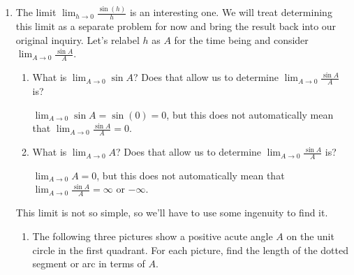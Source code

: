\documentclass[main]{subfiles}
\begin{document}
\begin{enumerate}
\begin{enumerate}
  \end{enumerate}

\pspace{\newpage}

\item 
  The limit $\displaystyle \lim_{h \to 0} \frac{\sin(h)}{h}$ is an
  interesting one. We will treat determining this limit as a separate problem for now and bring the result back into our original inquiry. Let's relabel $h$ as $A$ for the time being and consider $\displaystyle \lim_{A \to 0} \frac{\sin A}{A}$.

  \begin{enumerate}
  \item


    \begin{problem}[0.25in]
      What is $\displaystyle \lim_{A \to 0} \sin A$?  Does that allow us
      to determine $\displaystyle \lim_{A \to 0} \frac{\sin A}{A}$ is?
    \end{problem}

    \begin{solution}
      $\displaystyle \lim_{A \to 0} \sin A = \sin(0) = 0$, but this does
      not automatically mean that $\displaystyle \lim_{A \to 0}
      \frac{\sin A}{A} = 0$.
    \end{solution}

  \item
    \begin{problem}[0.25in]
      What is $\displaystyle \lim_{A \to 0} A$?  Does that allow us to
      determine $\displaystyle \lim_{A \to 0} \frac{\sin A}{A}$ is?      
    \end{problem}

    \begin{solution}
      $\displaystyle \lim_{A \to 0} A = 0$, but this does not
      automatically mean that $\displaystyle \lim_{A \to 0} \frac{\sin A}{A} =
      \infty$ or $-\infty$.
    \end{solution}

  \end{enumerate}

  This limit is not so simple, so we'll have to use some ingenuity to find
  it.
  \begin{enumerate}[resume]

  \item
    \begin{problem}
      The following three pictures show a positive acute angle $A$
      on the unit circle in the first quadrant.  For each picture, find the length of the dotted segment or arc in terms of $A$.
    \end{problem}


\end{enumerate}
\end{enumerate}
\end{document}
